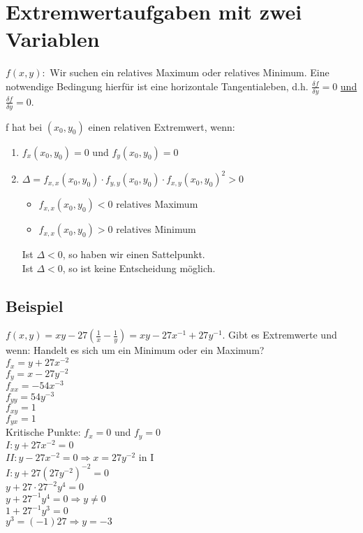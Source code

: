 \section{Extremwertaufgaben mit zwei Variablen}
$ f(x,y): $ Wir suchen ein relatives Maximum oder relatives Minimum. Eine notwendige Bedingung hierfür ist eine horizontale Tangentialeben, d.h. $ \frac{\delta f}{\delta y} = 0 $ \underline{und} $ \frac{\delta f}{\delta y} = 0 $. 

\begin{satz}[Rezept]
f hat bei $ (x_0,y_0)$ einen relativen Extremwert, wenn: 
\begin{enumerate}
\item $f_x(x_0,y_0) = 0$ und $f_y(x_0,y_0) = 0$
\item $\Delta = f_{x,x}(x_0,y_0)\cdot f_{y,y}(x_0,y_0)\cdot f_{x,y}(x_0,y_0)^2 > 0 $
	\begin{itemize}
	\item $f_{x,x}(x_0,y_0) < 0$ relatives Maximum 
	\item $f_{x,x}(x_0,y_0) > 0$ relatives Minimum
	\end{itemize}
	Ist $\Delta < 0$, so haben wir einen Sattelpunkt.\\
	Ist $\Delta < 0$, so ist keine Entscheidung möglich. 
\end{enumerate}
\end{satz}

\subsection{Beispiel}
$ f(x,y)= x y - 27(\frac{1}{x} - \frac{1}{y}) = x y - 27 x^{-1} + 27 y^{-1}$. 
Gibt es Extremwerte und wenn: Handelt es sich um ein Minimum oder ein Maximum?\\

$f_x = y + 27 x^{-2}$\\
$f_y = x - 27 y^{-2}$\\
$f_{xx} = -54 x^{-3}$\\
$f_{yy} = 54 y^{-3}$\\
$f_{xy} = 1$\\
$f_{yx} = 1$\\
Kritische Punkte: $f_x=0$ und $f_y=0$\\
$I: y+27x^{-2}=0$\\
$II: y-27x^{-2}=0 \Rightarrow x = 27 y ^{-2} $ in I\\
$I: y+27(27 y^{-2})^{-2} = 0 $\\
$y+27 \cdot 27^{-2} y^4 = 0 $\\
$y+27^{-1} y^4 = 0 \Rightarrow y \neq 0$\\
$1+27^{-1} y^3=0$\\
$y^3=(-1)27 \Rightarrow y=-3$\\

